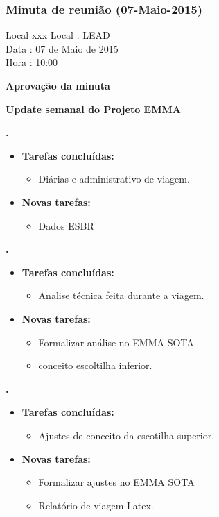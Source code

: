 \subsubsection{Minuta de reunião (07-Maio-2015)}

\begin{tabbing}
  Local \= xxx \kill
  Local \> : LEAD \\
  Data  \> : 07 de Maio de 2015 \\
  Hora  \> : 10:00
\end{tabbing}


\textbf{Aprovação da minuta}

\textbf{Update semanal do Projeto EMMA}
  

 \textbf{\alana.} 
	\begin{itemize}
		\item \textbf{Tarefas concluídas:}
			\begin{itemize}    
				\item Diárias e administrativo de viagem.
			\end{itemize}
		
		\item \textbf{Novas tarefas:}
			\begin{itemize} 
				\item Dados ESBR
			\end{itemize}
	\end{itemize}
  
  
\textbf{\renan.} 
	\begin{itemize}
		\item \textbf{Tarefas concluídas:}
			\begin{itemize}    
				\item Analise técnica feita durante a viagem.
			\end{itemize}
		
		\item \textbf{Novas tarefas:}
			\begin{itemize} 
				\item Formalizar análise no EMMA SOTA
				\item conceito escoltilha inferior.
			\end{itemize}
	\end{itemize}
		
\textbf{\elael.} 
	\begin{itemize}
		\item \textbf{Tarefas concluídas:}
			\begin{itemize}    
				\item Ajustes de conceito da escotilha superior.
			\end{itemize}
		
		\item \textbf{Novas tarefas:}
			\begin{itemize} 
				\item Formalizar ajustes no EMMA SOTA
				\item Relatório de viagem Latex.
			\end{itemize}
	\end{itemize}
					
